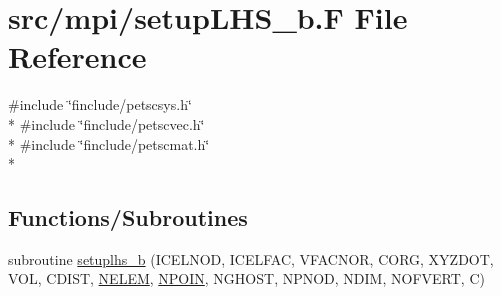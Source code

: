 \hypertarget{mpi_2setup_l_h_s__b_8_f}{\section{src/mpi/setup\-L\-H\-S\-\_\-b.F File Reference}
\label{mpi_2setup_l_h_s__b_8_f}
}
{\ttfamily \#include \char`\"{}finclude/petscsys.\-h\char`\"{}}\\*
{\ttfamily \#include \char`\"{}finclude/petscvec.\-h\char`\"{}}\\*
{\ttfamily \#include \char`\"{}finclude/petscmat.\-h\char`\"{}}\\*
\subsection*{Functions/\-Subroutines}
\begin{DoxyCompactItemize}
\item 
subroutine \hyperlink{mpi_2setup_l_h_s__b_8_f_a3bc0e4b4e5b397e696909a58b1a8b0d8}{setuplhs\-\_\-b} (I\-C\-E\-L\-N\-O\-D, I\-C\-E\-L\-F\-A\-C, V\-F\-A\-C\-N\-O\-R, C\-O\-R\-G, X\-Y\-Z\-D\-O\-T, V\-O\-L, C\-D\-I\-S\-T, \hyperlink{mesh_8com_aee5e75b79d0e815c0603cfbccc618957}{N\-E\-L\-E\-M}, \hyperlink{mesh_8com_ae28c1572321efcd8715b974d87d20c58}{N\-P\-O\-I\-N}, N\-G\-H\-O\-S\-T, N\-P\-N\-O\-D, N\-D\-I\-M, N\-O\-F\-V\-E\-R\-T, C)
\end{DoxyCompactItemize}


